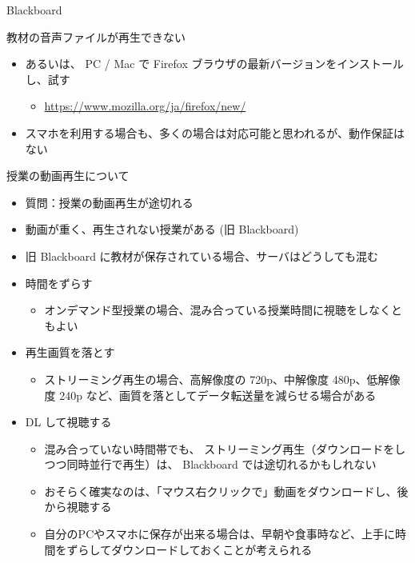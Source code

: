 \documentclass[a4j,10pt]{jsarticle}
\begin{document}
{\begin{frame}[label={sec:org166405d},fragile]{Blackboard}
\begin{block}{教材の音声ファイルが再生できない}
\begin{itemize}
\begin{itemize}
\item Web ブラウザを変更するだけで解決することも多い
\end{itemize}
\par
\item あるいは、 PC / Mac で Firefox ブラウザの最新バージョンをインストールし、試す
\begin{itemize}
\item \url{https://www.mozilla.org/ja/firefox/new/}
\end{itemize}
\par
\item スマホを利用する場合も、多くの場合は対応可能と思われるが、動作保証はない
\end{itemize}
\end{block}
\par
\begin{block}{授業の動画再生について}
\begin{itemize}
\item 質問：授業の動画再生が途切れる
\par
\item 動画が重く、再生されない授業がある (旧 Blackboard)
\item 旧 Blackboard に教材が保存されている場合、サーバはどうしても混む
\par
\item 時間をずらす
\begin{itemize}
\item オンデマンド型授業の場合、混み合っている授業時間に視聴をしなくともよい
\end{itemize}
\par
\item 再生画質を落とす
\begin{itemize}
\item ストリーミング再生の場合、高解像度の 720p、中解像度 480p、低解像度 240p など、画質を落としてデータ転送量を減らせる場合がある
\end{itemize}
\par
\item DL して視聴する
\begin{itemize}
\item 混み合っていない時間帯でも、 ストリーミング再生（ダウンロードをしつつ同時並行で再生）は、 Blackboard では途切れるかもしれない
\item おそらく確実なのは、「マウス右クリックで」動画をダウンロードし、後から視聴する
\item 自分のPCやスマホに保存が出来る場合は、早朝や食事時など、上手に時間をずらしてダウンロードしておくことが考えられる

\end{itemize}
\end{itemize}
\end{block}
\end{frame}}
\end{document}
